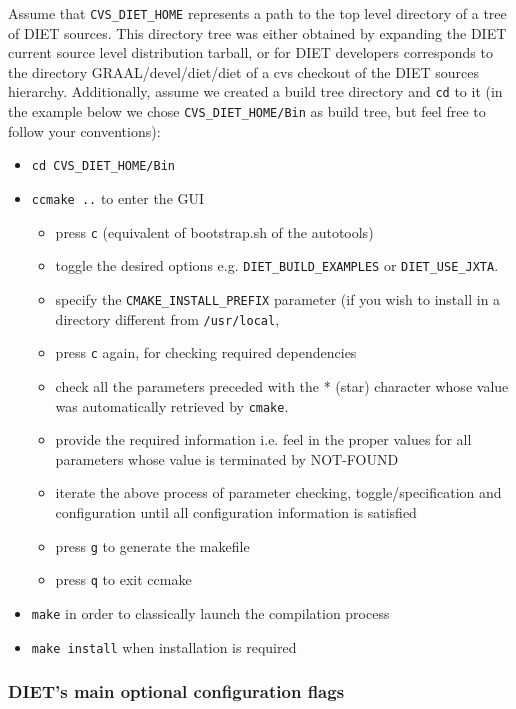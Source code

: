 Assume that \verb+CVS_DIET_HOME+ represents a path to the top level
directory of a tree of DIET sources.
This directory tree was either obtained by expanding the DIET current
source level distribution tarball, or for DIET developers corresponds to
the directory GRAAL/devel/diet/diet of a cvs checkout of the DIET sources
hierarchy.
Additionally, assume we created a build tree directory and \verb+cd+
to it (in the example below we chose \verb+CVS_DIET_HOME/Bin+ as
build tree, but feel free to follow your conventions):
\begin{itemize}
\item
  \verb+cd CVS_DIET_HOME/Bin+
\item
  \verb+ccmake ..+ to enter the GUI
  \begin{itemize}
  \item press \verb+c+ (equivalent of bootstrap.sh of the autotools)
  \item toggle the desired options e.g. \verb+DIET_BUILD_EXAMPLES+ or
     \verb+DIET_USE_JXTA+. 
  \item specify the \verb+CMAKE_INSTALL_PREFIX+ parameter (if you wish
     to install in a directory different from \verb+/usr/local+,
  \item press \verb+c+ again, for checking required dependencies
  \item check all the parameters preceded with the * (star) character
     whose value was automatically retrieved by \verb+cmake+.
  \item provide the required information i.e. feel in the proper values
     for all parameters whose value is terminated by NOT-FOUND
  \item iterate the above process of parameter checking, toggle/specification
     and configuration until all configuration information is satisfied
  \item press \verb+g+ to generate the makefile
  \item press \verb+q+ to exit ccmake
  \end{itemize}
\item
  \verb+make+ in order to classically launch the compilation process
\item
  \verb+make install+ when installation is required
\end{itemize}

\subsubsection{DIET's main optional configuration flags}

